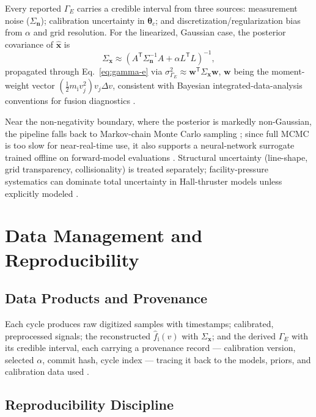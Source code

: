 Every reported $\Gamma_{E}$ carries a credible interval from three sources: measurement noise ($\Sigma_{\mathbf{n}}$); calibration uncertainty in $\boldsymbol{\theta}_c$; and discretization/regularization bias from $\alpha$ and grid resolution. For the linearized, Gaussian case, the posterior covariance of $\hat{\mathbf{x}}$ is
\begin{equation}
\Sigma_{\mathbf{x}} \approx \left( A^{\mathsf{T}} \Sigma_{\mathbf{n}}^{-1} A + \alpha L^{\mathsf{T}} L \right)^{-1},
\label{ch19-eq:posterior-cov}
\end{equation}
propagated through Eq.~\eqref{eq:gamma-e} via $\sigma_{\Gamma_E}^2 \approx \mathbf{w}^{\mathsf{T}} \Sigma_{\mathbf{x}} \mathbf{w}$, $\mathbf{w}$ being the moment-weight vector $\left(\tfrac{1}{2} m_{\mathrm{i}} v_j^2\right) v_j \Delta v$, consistent with Bayesian integrated-data-analysis conventions for fusion diagnostics \cite{ref0713}.

Near the non-negativity boundary, where the posterior is markedly non-Gaussian, the pipeline falls back to Markov-chain Monte Carlo sampling \cite{ref0710,ref0727}; since full MCMC is too slow for near-real-time use, it also supports a neural-network surrogate trained offline on forward-model evaluations \cite{ref0728,ref0731}. Structural uncertainty (line-shape, grid transparency, collisionality) is treated separately; facility-pressure systematics can dominate total uncertainty in Hall-thruster models unless explicitly modeled \cite{ref0719}.

\section{Data Management and Reproducibility}
\label{sec:data-repro}

\subsection{Data Products and Provenance}

Each cycle produces raw digitized samples with timestamps; calibrated, preprocessed signals; the reconstructed $\hat f_{\mathrm{i}}(v)$ with $\Sigma_{\mathbf{x}}$; and the derived $\Gamma_{E}$ with its credible interval, each carrying a provenance record — calibration version, selected $\alpha$, commit hash, cycle index — tracing it back to the models, priors, and calibration data used \cite{ref0712}.

\subsection{Reproducibility Discipline}

